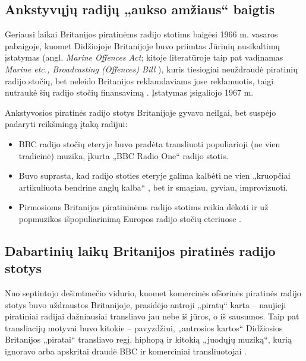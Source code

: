 \documentclass[kursinis-darbas]{vukf}
\begin{document}
\subsection{Ankstyvųjų radijų „aukso amžiaus“ baigtis}

Geriausi laikai Britanijos piratinėms radijo stotims baigėsi 1966 m. vasaros pabaigoje, kuomet Didžiojoje Britanijoje buvo priimtas Jūrinių nusikaltimų įstatymas (angl. \emph{Marine Offences Act}; kitoje literatūroje taip pat vadinamas \emph{Marine etc., Broadcasting (Offences) Bill} \cite[p.~139]{hc_key_concepts_in_radio_studies}), kuris tiesiogiai neuždraudė piratinių radijo stočių, bet neleido Britanijos reklamdaviams jose reklamuotis, taigi nutraukė šių radijo stočių finansavimą \cite[p.~238]{chs_encyclopedia_of_radio}. Įstatymas įsigaliojo 1967 m.

Ankstyvosios piratinės radijo stotys Britanijoje gyvavo neilgai, bet suspėjo padaryti reikšmingą įtaką radijui:

\begin{itemize}
	\item \gls{BBC} radijo stočių eteryje buvo pradėta transliuoti populiarioji (ne vien tradicinė) muzika, įkurta „\gls{BBC} Radio One“ radijo stotis.
	\item Buvo suprasta, kad radijo stoties eteryje galima kalbėti ne vien „kruopčiai artikuliuota bendrine anglų kalba“ \cite[p.~238]{chs_encyclopedia_of_radio}, bet ir smagiau, gyviau, improvizuoti.
	\item Pirmosioms Britanijos piratininėms radijo stotims reikia dėkoti ir už popmuzikos išpopuliarinimą Europos radijo stočių eteriuose \cite[p.~447]{js_continuum_encyclopedia}.
\end{itemize}


\subsection{Dabartinių laikų Britanijos piratinės radijo stotys}

Nuo septintojo dešimtmečio vidurio, kuomet komercinės ofšorinės piratinės radijo stotys buvo uždraustos Britanijoje, prasidėjo antroji „piratų“ karta – naujieji piratiniai radijai dažniausiai transliavo jau nebe iš jūros, o iš sausumos. Taip pat transliacijų motyvai buvo kitokie \cite[p.~448]{js_continuum_encyclopedia} – pavyzdžiui, „antrosios kartos“ Didžiosios Britanijos „piratai“ transliavo regį, hiphopą ir kitokią „juodųjų muziką“, kurią ignoravo arba apskritai draudė \gls{BBC} ir komerciniai transliuotojai \cite[p.~447]{js_continuum_encyclopedia}.
\end{document}
